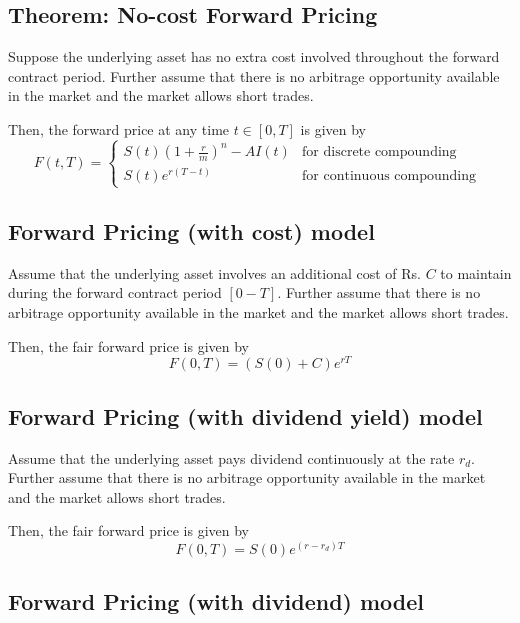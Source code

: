 \documentclass{report}
\begin{document}
\subsection{Theorem: No-cost Forward Pricing}
Suppose the underlying asset has no extra cost involved throughout the forward contract period. Further assume that there is no arbitrage opportunity available in the market and the market allows short trades.


Then, the forward price at any time $t \in [0,T]$ is given by
\begin{equation}
F(t,T) = \begin{cases} 
S(t)(1+\frac{r}{m})^n - AI(t) & \text{for discrete compounding}\\
S(t)e^{r(T-t)} & \text{for continuous compounding } 
\end{cases}
\end{equation}


\subsection{Forward Pricing (with cost) model}

Assume that the underlying asset involves an additional cost of Rs. $C$ to maintain during the forward contract period $[0-T]$. Further assume that there is no arbitrage opportunity available in the market and the market allows short trades.


Then, the fair forward price is given by
\begin{equation}
F(0,T) = (S(0)+C)e^{rT}
\end{equation}

\subsection{Forward Pricing (with dividend yield) model}

Assume that the underlying asset pays dividend continuously at the rate $r_d$. Further assume that there is no arbitrage opportunity available in the market and the market allows short trades.


Then, the fair forward price is given by
\begin{equation}
F(0,T) = S(0)e^{(r-r_d)T}
\end{equation}


\subsection{Forward Pricing (with dividend) model}
\end{document}
